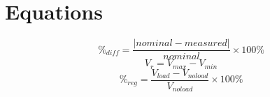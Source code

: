 \documentclass{article}
\begin{document}
\section{Equations}
\label{sec:equations}

%
\begin{equation}
  \label{eq:percent_diff}
  \%_{diff} = \frac{|nominal - measured|}{nominal}\times 100\%
\end{equation}
%
\begin{equation}
  \label{eq:ripple}
  V_r = V_{max} - V_{min}
\end{equation}
%
\begin{equation}
  \label{eq:volt_reg}
  \%_{reg} = \frac{V_{load} - V_{no load}}{V_{no load}}\times 100\%
\end{equation}
\end{document}
